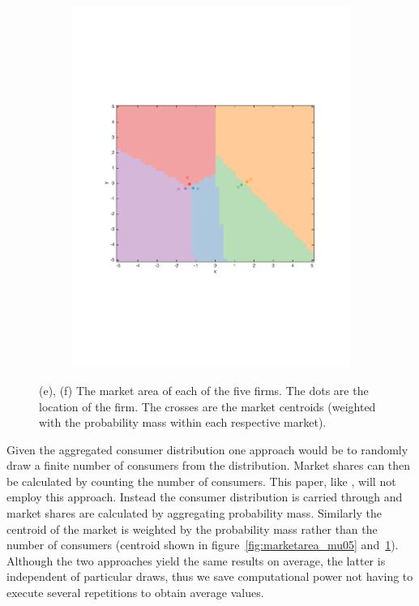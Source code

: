 \documentclass[preprint, 12pt]{elsarticle}
\begin{document}
\begin{figure}[htp!]
\begin{subfigure}[t]{0.485\textwidth}
		\includegraphics[width=\textwidth, trim={15mm 80mm 20mm 75mm}]{Graphics/marketarea_mu15_nratio2.pdf}
		\caption{}
		\label{fig:marketarea_mu15}
	\end{subfigure}
	\caption*{(e), (f) The market area of each of the five firms. The dots are the location of the firm. The crosses are the market centroids (weighted with the probability mass within each respective market).}
	
	\label{fig:distribution}
\end{figure}

Given the aggregated consumer distribution one approach would be to randomly draw a finite number of consumers from the distribution. Market shares can then be calculated by counting the number of consumers. This paper, like \citet{Laver_Sergenti_2011}, will not employ this approach. Instead the consumer distribution is carried through and market shares are calculated by aggregating probability mass. Similarly the centroid of the market is weighted by the probability mass rather than the number of consumers (centroid shown in figure~\ref{fig:marketarea_mu05} and~\ref{fig:marketarea_mu15}). Although the two approaches yield the same results on average, the latter is independent of particular draws, thus we save computational power not having to execute several repetitions to obtain average values.
\end{document}
